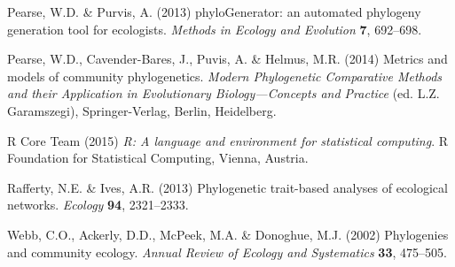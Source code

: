 \documentclass{bioinfo}
\begin{document}
\begin{thebibliography}{30}
 Pearse, W.D. \& Purvis,
  A. (2013) phyloGenerator: an automated phylogeny generation tool for
  ecologists. \emph{Methods in Ecology and Evolution} \textbf{7},
  692--698.

Pearse, W.D., Cavender-Bares, J., Puvis, A. \& Helmus, M.R. (2014) Metrics and
  models of community phylogenetics. \emph{Modern Phylogenetic Comparative
  Methods and their Application in Evolutionary Biology---Concepts and
  Practice} (ed. L.Z. Garamszegi), Springer-Verlag, Berlin, Heidelberg.

{R Core Team} (2015) \emph{R: A language and environment for statistical
  computing}. R Foundation for Statistical Computing, Vienna, Austria.

 Rafferty, N.E. \&
  Ives, A.R. (2013) Phylogenetic trait-based analyses of ecological
  networks. \emph{Ecology} \textbf{94}, 2321--2333.

Webb, C.O., Ackerly, D.D., McPeek, M.A. \& Donoghue, M.J. (2002) Phylogenies
  and community ecology. \emph{Annual Review of Ecology and Systematics}
  \textbf{33}, 475--505.
\end{thebibliography}
\end{document}
